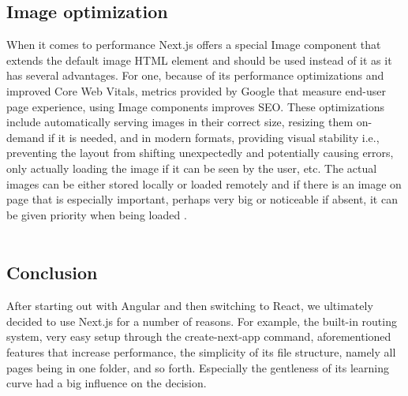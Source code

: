 \subsection{Image optimization}
When it comes to performance Next.js offers a special Image component that extends the default image HTML element and should be used instead of
it as it has several advantages. For one, because of its performance optimizations and improved Core Web Vitals, metrics provided by Google that
measure end-user page experience, using Image components improves SEO. These optimizations include automatically serving images in their correct
size, resizing them on-demand if it is needed, and in modern formats, providing visual stability i.e., preventing the layout from shifting unexpectedly
and potentially causing errors, only actually loading the image if it can be seen by the user, etc. The actual images can be either stored locally
or loaded remotely and if there is an image on page that is especially important, perhaps very big or noticeable if absent, it can be given priority
when being loaded \cite{NextjsImageOptimization}.
\\
\\
\subsection{Conclusion}
After starting out with Angular and then switching to React, we ultimately decided to use Next.js for a number of reasons. For example, the built-in
routing system, very easy setup through the create-next-app command, aforementioned features that increase performance, the simplicity of its
file structure, namely all pages being in one folder, and so forth. Especially the gentleness of its learning curve had a big influence on the decision.

